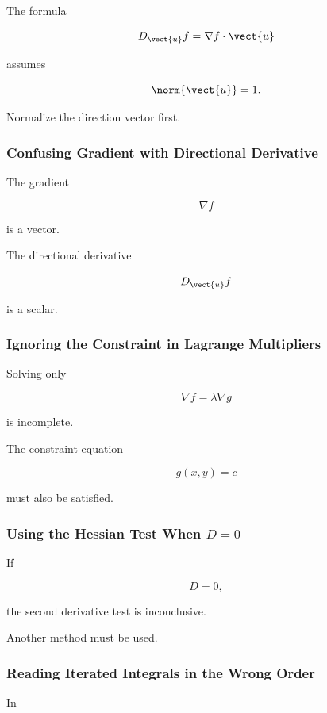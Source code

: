 The formula

\[ D_{\vect{u}}f=\nabla f\cdot\vect{u} \]

assumes

\[ \norm{\vect{u}}=1. \]

Normalize the direction vector first.

\subsubsection{Confusing Gradient with Directional Derivative}

The gradient

\[ \nabla f \]

is a vector.

The directional derivative

\[ D_{\vect{u}}f \]

is a scalar.

\subsubsection{Ignoring the Constraint in Lagrange Multipliers}

Solving only

\[ \nabla f=\lambda\nabla g \]

is incomplete.

The constraint equation

\[ g(x,y)=c \]

must also be satisfied.

\subsubsection{Using the Hessian Test When \(D=0\)}

If

\[ D=0, \]

the second derivative test is inconclusive.

Another method must be used.

\subsubsection{Reading Iterated Integrals in the Wrong Order}

In

